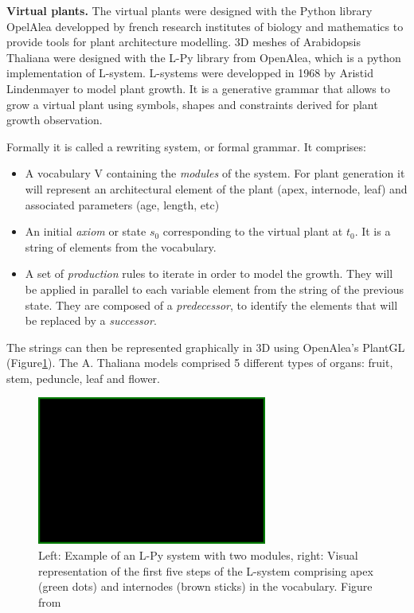 
\textbf{Virtual plants.} The virtual plants were designed with the Python library OpelAlea \cite{} developped by french research institutes of biology and mathematics to provide tools for plant architecture modelling. 3D meshes of Arabidopsis Thaliana were designed with the L-Py library from OpenAlea, which is a python implementation of L-system. L-systems were developped in 1968 by Aristid Lindenmayer \cite{} to model plant growth. It is a generative grammar that allows to grow a virtual plant using symbols, shapes and constraints derived for plant growth observation. 

Formally it is called a rewriting system, or formal grammar. It comprises: 

\begin{itemize}
    \item A vocabulary V containing the \textit{modules} of the system. For plant generation it will represent an architectural element of the plant (apex, internode, leaf) and associated parameters (age, length, etc)
    \item An initial \textit{axiom} or state $s_0$ corresponding to the virtual plant at $t_0$. It is a string of elements from the vocabulary.
    \item A set of \textit{production} rules to iterate in order to model the growth. They will be applied in parallel to each variable element from the string of the previous state. They are composed of a \textit{predecessor}, to identify the elements that will be replaced by a \textit{successor}.
\end{itemize}

The strings can then be represented graphically in 3D using OpenAlea's PlantGL (Figure\ref{fig:lpy}). The A. Thaliana models comprised 5 different types of organs: fruit, stem, peduncle, leaf and flower.\\

\begin{figure}[h!]
    \centering
    \includegraphics[width = 0.1\linewidth]{figures/blank.png}
    \caption{Left: Example of an L-Py system with two modules, right: Visual representation of the first five steps of the L-system comprising apex (green dots) and internodes (brown sticks) in the vocabulary. Figure from \cite{boudon_l-py:_2012}}
    \label{fig:lpy}
\end{figure}


